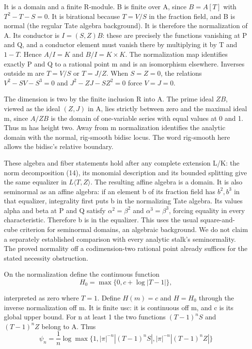 \documentclass[11pt,a4paper]{article}
\begin{document}
It is a domain and a finite R-module. B is finite over A, since \(B=A[T]\) with \(T^2-T-S=0\). It is birational because \(T=V/S\) in the fraction field, and B is normal (the regular Tate algebra background). It is therefore the normalization of A. Its conductor is \(I=(S,Z)B\): these are precisely the functions vanishing at P and Q, and a conductor element must vanish there by multiplying it by T and \(1-T\). Hence \(A/I=K\) and \(B/I=K\times K\). The normalization map identifies exactly P and Q to a rational point m and is an isomorphism elsewhere. Inverses outside m are \(T=V/S\) or \(T=J/Z\). When \(S=Z=0\), the relations \(V^2-SV-S^3=0\) and \(J^2-ZJ-SZ^2=0\) force \(V=J=0\).

The dimension is two by the finite inclusion R into A. The prime ideal \(ZB\), viewed as the ideal \((Z,J)\) in A, lies strictly between zero and the maximal ideal m, since \(A/ZB\) is the domain of one-variable series with equal values at 0 and 1. Thus m has height two. Away from m normalization identifies the analytic domain with the normal, rig-smooth bidisc locus. The word rig-smooth here allows the bidisc's relative boundary.

These algebra and fiber statements hold after any complete extension L/K: the norm decomposition (14), its monomial description and its bounded splitting give the same equalizer in \(L\langle T,Z\rangle\). The resulting affine algebra is a domain. It is also seminormal as an affine algebra: if an element b of its fraction field has \(b^2,b^3\) in that equalizer, integrality first puts b in the normalizing Tate algebra. Its values alpha and beta at P and Q satisfy \(\alpha^2=\beta^2\) and \(\alpha^3=\beta^3\), forcing equality in every characteristic. Therefore b is in the equalizer. This uses the usual square-and-cube criterion for seminormal domains, an algebraic background. We do not claim a separately established comparison with every analytic stalk's seminormality. The proved normality off a codimension-two rational point already suffices for the stated necessity obstruction.

On the normalization define the continuous function
\[
H_0=\max\{0,c+\log|T-1|\},
\]

interpreted as zero where \(T=1\). Define \(H(m)=c\) and \(H=H_0\) through the inverse normalization off m. It is finite usc: it is continuous off m, and c is its global upper bound. For n at least 1 the two functions \((T-1)^nS\) and \((T-1)^nZ\) belong to A. Thus
\[
\psi_n=\frac1n\log\max\{1,|\pi|^{-n}|(T-1)^nS|,|\pi|^{-n}|(T-1)^nZ|\}
\tag{15}
\]
\end{document}
